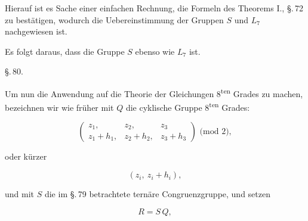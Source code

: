 
Hierauf ist es Sache einer einfachen Rechnung, die Formeln
des Theorems I., \S.\,72 zu best\"atigen, wodurch die Uebereinstimmung
 der Gruppen $S$ und $L_7$ nachgewiesen ist.

Es folgt daraus, dass die Gruppe $S$ ebenso wie $L_7$ 
 ist.

\begin{center}
\S.\,80.

\end{center}

Um nun die Anwendung auf die Theorie der Gleichungen
8\textsuperscript{ten} Grades zu machen, bezeichnen wir wie fr\"uher mit $Q$ die
cyklische Gruppe 8\textsuperscript{ten} Grades: %

\[
\begin{pmatrix} z_1, & z_2, & z_3 \\ z_1 + h_1, & z_2 + h_2, & z_3 + h_3 \end{pmatrix} \text{ (mod 2)},
\]

oder k\"urzer

\[
(z_i,\ z_i + h_i),
\]

und mit $S$ die im \S.\,79 betrachtete tern\"are Congruenzgruppe,
und setzen

\[
R = S\,Q,
\]
